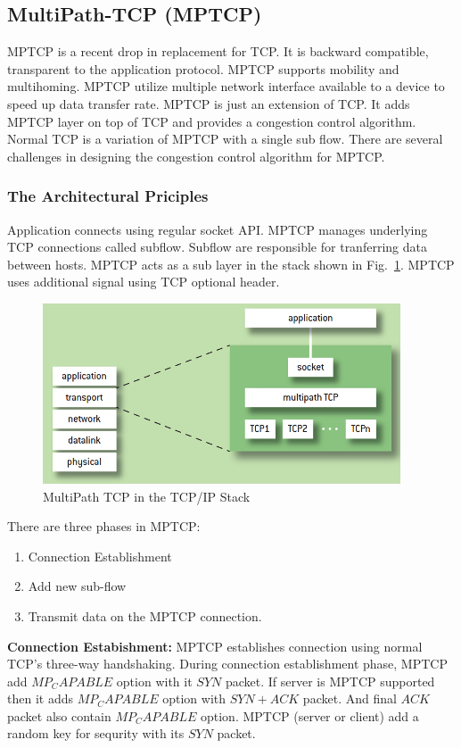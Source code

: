 \subsection{MultiPath-TCP (MPTCP)}
MPTCP\cite{scharf2013multipath} is a recent drop in replacement for TCP. It is backward compatible, transparent to the application protocol. MPTCP supports mobility and multihoming. MPTCP utilize multiple network interface available to a device to speed up data transfer rate. MPTCP is just an extension of TCP\cite{mptcpsurvey}. It adds MPTCP layer on top of TCP and provides a congestion control algorithm. Normal TCP is a variation of MPTCP with a single sub flow. There are several challenges in designing the congestion control algorithm for MPTCP.

\subsubsection{The Architectural Priciples}
Application connects using regular socket API. MPTCP manages underlying TCP connections called subflow. Subflow are responsible for tranferring data between hosts. MPTCP acts as a sub layer in the stack shown in Fig.~\ref{fig:mptcpstack}. MPTCP uses additional signal using TCP optional header.

\begin{figure}[h!]
\centering
\includegraphics{img/mptcp/paasch1}
\caption{MultiPath TCP in the TCP/IP Stack}
\label{fig:mptcpstack}
\end{figure}
There are three phases in MPTCP:
\begin{enumerate}
    \item Connection Establishment
    \item Add new sub-flow
    \item Transmit data on the MPTCP connection.
\end{enumerate}

\textbf{Connection Estabishment:}
MPTCP establishes connection using normal TCP's three-way handshaking. During connection establishment phase, MPTCP add $MP_CAPABLE$ option with it $SYN$ packet. If server is MPTCP supported then it adds $MP_CAPABLE$ option with $SYN+ACK$ packet. And final $ACK$ packet also contain $MP_CAPABLE$ option. MPTCP (server or client) add a random key for sequrity with its $SYN$ packet. 

